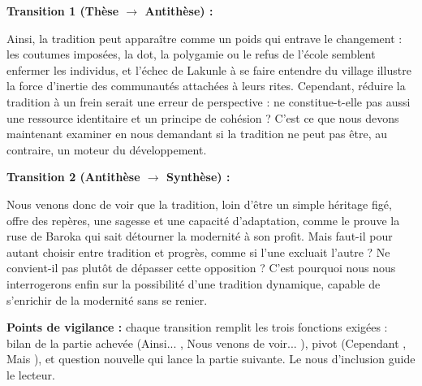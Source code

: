 \documentclass[11pt]{article}
\begin{document}
\begin{corrige}
\textbf{Transition 1 (Thèse $\rightarrow$ Antithèse) :}

\og Ainsi, la tradition peut apparaître comme un poids qui entrave le changement : les coutumes imposées, la dot, la polygamie ou le refus de l'école semblent enfermer les individus, et l'échec de Lakunle à se faire entendre du village illustre la force d'inertie des communautés attachées à leurs rites. Cependant, réduire la tradition à un frein serait une erreur de perspective : ne constitue-t-elle pas aussi une ressource identitaire et un principe de cohésion ? C'est ce que nous devons maintenant examiner en nous demandant si la tradition ne peut pas être, au contraire, un moteur du développement. \fg

\textbf{Transition 2 (Antithèse $\rightarrow$ Synthèse) :}

\og Nous venons donc de voir que la tradition, loin d'être un simple héritage figé, offre des repères, une sagesse et une capacité d'adaptation, comme le prouve la ruse de Baroka qui sait détourner la modernité à son profit. Mais faut-il pour autant choisir entre tradition et progrès, comme si l'une excluait l'autre ? Ne convient-il pas plutôt de dépasser cette opposition ? C'est pourquoi nous nous interrogerons enfin sur la possibilité d'une tradition dynamique, capable de s'enrichir de la modernité sans se renier. \fg

\textbf{Points de vigilance :} chaque transition remplit les trois fonctions exigées : bilan de la partie achevée (\og Ainsi... \fg, \og Nous venons de voir... \fg), pivot (\og Cependant \fg, \og Mais \fg), et question nouvelle qui lance la partie suivante. Le \og nous \fg{} d'inclusion guide le lecteur.
\end{corrige}
\end{document}
